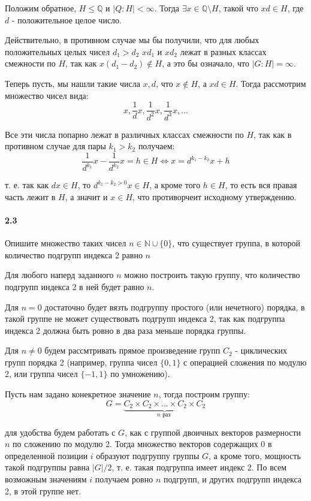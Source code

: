 \documentclass[a4paper,12pt]{article}
\begin{document}
\begin{Solution}
Положим обратное, $H \le \mathbb{Q}$ и $\left|Q : H\right| < \infty$. Тогда $\exists x \in \mathbb{Q} \setminus H$, такой что $xd \in H$, где $d$ - положительное целое число.

Действительно, в противном случае мы бы получили, что для любых положительных целых чисел $d_1 > d_2$ $xd_1$ и $xd_2$ лежат в разных классах смежности по $H$, так как $x\left(d_1 - d_2\right) \not\in H$, а это бы означало, что $\left|G : H\right| = \infty$.

Теперь пусть, мы нашли такие числа $x, d$, что $x \not\in H$, а $xd \in H$. Тогда рассмотрим множество чисел вида:
\[
	x, \frac{1}{d} x, \frac{1}{d^2} x, \frac{1}{d^3} x, ...
\]

Все эти числа попарно лежат в различных классах смежности по $H$, так как в противном случае для пары $k_1 > k_2$ получаем:
\[
	\frac{1}{d^{k_1}} x - \frac{1}{d^{k_2}} x = h \in H \Leftrightarrow x = d^{k_1 - k_2} x + h
\]

т. е. так как $d x \in H$, то $d^{k_1 - k_2 > 0} x \in H$, а кроме того $h \in H$, то есть вся правая часть лежит в $H$, а значит и $x \in H$, что противорчеит исходному утверждению.
\end{Solution}

\paragraph{2.3} Опишите множество таких чисел $n \in \mathbb{N} \cup \lbrace0\rbrace$, что существует группа, в которой количество подгрупп индекса 2 равно $n$

\begin{Solution}
Для любого наперд заданного $n$ можно построить такую группу, что количество подгрупп индекса 2 в ней будет равно $n$.

Для $n = 0$ достаточно будет вязть подгруппу простого (или нечетного) порядка, в такой группе не может существовать подгрупп индекса 2, так как подгруппа индекса 2 должна быть ровно в два раза меньше порядка группы.

Для $n \not= 0$ будем рассмтривать прямое произведение групп $C_2$ - циклических групп порядка 2 (например, группа чисел $\lbrace 0,1\rbrace$ с операцией сложения по модулю 2, или группа чисел $\lbrace -1, 1\rbrace$ по умножению).

Пусть нам задано конекретное значение $n$, тогда построим группу:
\[
	G = \underbrace{C_2 \times C_2 \times ... \times C_2 \times C_2}_{n \text{ раз }}
\]

для удобства будем работать с $G$, как с группой двоичных векторов размерности $n$ по сложению по модулю 2. Тогда множество векторов содержащих 0 в определенной позиции $i$ образуют подгруппу группы $G$, а кроме того, мощность такой подгруппы равна ${\left|G\right|}/2$, т. е. такая подгруппа имеет индекс 2. По всем возможным значениям $i$ получаем ровно $n$ подгрупп, и других подгрупп индекса 2, в этой группе нет.
\end{Solution}
\end{document}
